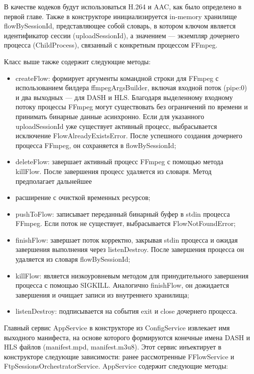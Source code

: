 	В качестве кодеков будут использоваться H.264 и AAC, как было определено в первой главе. Также в конструкторе инициализируется in-memory хранилище flowBySessionId, представляющее собой словарь, в котором ключом является идентификатор сессии (uploadSessionId), а значением — экземпляр дочернего процесса (ChildProcess), связанный с конкретным процессом FFmpeg.

	Класс выше также содержит следующие методы:

	\begin{itemize}[label=$\bullet$]
		\item createFlow: формирует аргументы командной строки для FFmpeg с использованием билдера ffmpegArgsBuilder, включая входной поток (pipe:0) и два выходных — для DASH и HLS. Благодаря выделенному входному потоку процессы FFmpeg могут существовать без ограничений по времени и принимать бинарные данные асинхронно. Если для указанного uploadSessionId уже существует активный процесс, выбрасывается исключение FlowAlreadyExistsError. После успешного создания дочернего процесса FFmpeg, он сохраняется в flowBySessionId;
		\item deleteFlow: завершает активный процесс FFmpeg с помощью метода killFlow. После завершения процесс удаляется из словаря. Метод предполагает дальнейшее \item расширение с очисткой временных ресурсов;
		\item pushToFlow: записывает переданный бинарный буфер в stdin процесса FFmpeg. Если поток не существует, выбрасывается FlowNotFoundError;
		\item finishFlow: завершает поток корректно, закрывая stdin процесса и ожидая завершения выполнения через listenDestroy. После завершения процесса он удаляется из словаря flowBySessionId;
		\item killFlow: является низкоуровневым методом для принудительного завершения процесса с помощью SIGKILL. Аналогично finishFlow, он дожидается завершения и очищает записи из внутреннего хранилища;
		\item listenDestroy: подписывается на события exit и close дочернего процесса.
	\end{itemize}

	Главный сервис AppService в конструкторе из ConfigService извлекает имя выходного манифеста, на основе которого формируются конечные имена DASH и HLS файлов (manifest.mpd, manifest.m3u8). Этот сервис инъектирует в конструкторе следующие зависимости: ранее рассмотренные FFlowService и FtpSessionsOrchestratorService. AppService содержит следующие методы:

